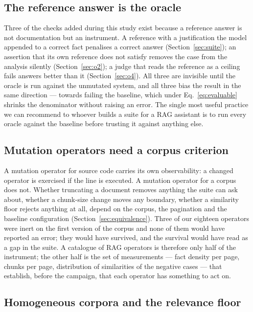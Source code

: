 \documentclass[a4paper,fleqn]{cas-dc}
\begin{document}
\subsection{The reference answer is the oracle}

Three of the checks added during this study exist because a reference answer
is not documentation but an instrument. A reference with a justification the
model appended to a correct fact penalises a correct answer
(Section~\ref{sec:suite}); an assertion that its own reference does not
satisfy removes the case from the analysis silently (Section~\ref{sec:o2}); a
judge that reads the reference as a ceiling fails answers better than it
(Section~\ref{sec:o4}). All three are invisible until the oracle is run
against the unmutated system, and all three bias the result in the same
direction --- towards failing the baseline, which under Eq.~\eqref{eq:evaluable}
shrinks the denominator without raising an error. The single most useful
practice we can recommend to whoever builds a suite for a RAG assistant is
to run every oracle against the baseline before trusting it against anything
else.

\subsection{Mutation operators need a corpus criterion}

A mutation operator for source code carries its own observability: a changed
operator is exercised if the line is executed. A mutation operator for a
corpus does not. Whether truncating a document removes anything the suite can
ask about, whether a chunk-size change moves any boundary, whether a
similarity floor rejects anything at all, depend on the corpus, the pagination
and the baseline configuration (Section~\ref{sec:equivalence}). Three of our
eighteen operators were inert on the first version of the corpus and none of
them would have reported an error; they would have survived, and the survival
would have read as a gap in the suite. A catalogue of RAG operators is
therefore only half of the instrument; the other half is the set of
measurements --- fact density per page, chunks per page, distribution of
similarities of the negative cases --- that establish, before the campaign,
that each operator has something to act on.

\subsection{Homogeneous corpora and the relevance floor}
\end{document}
